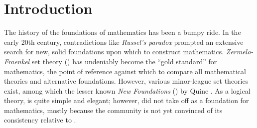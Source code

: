\documentclass[sigplan,10pt,anonymous,review]{acmart}%
\begin{document}



\maketitle

\section{Introduction}

The history of the foundations of mathematics has been a bumpy ride. In the early 20th century, contradictions like \emph{Russel's paradox} prompted an extensive search for new, solid foundations upon which to construct mathematics. \emph{Zermelo-Fraenkel} set theory (\ZF{}) has undeniably become the ``gold standard'' for mathematics, the point of reference against which to compare all mathematical theories and alternative foundations. However, various minor-league set theories exist, among which the lesser known \emph{New Foundations} (\NF) by Quine \cite{quine1937new}. As a logical theory, \NF{} is quite simple and elegant; however, \NF{} did not take off as a foundation for mathematics, mostly because the \NF{} community is not yet convinced of its consistency relative to \ZF{}.
\end{document}
